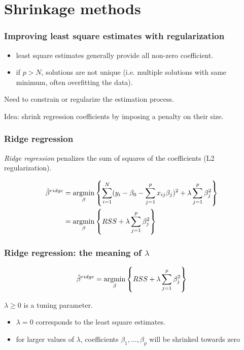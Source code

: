 \documentclass[notes]{beamer}          %
\newcommand{\argmin}{\operatornamewithlimits{argmin}}
\begin{document}
\section{Shrinkage methods}

\begin{frame}
\frametitle{Improving least square estimates with regularization}
\begin{itemize}
	\item least square estimates generally provide all non-zero coefficient.
	\item if $p>N$, solutions are not unique (i.e. multiple solutions with same minimum, often overfitting the data).
\end{itemize}


\vspace{5mm} 

Need to constrain or regularize the estimation process.

\vspace{5mm} 

Idea: shrink regression coefficients by imposing a penalty on their size.


\end{frame}

\begin{frame}
\frametitle{Ridge regression}
\textit{Ridge regression} penalizes the sum of squares of the coefficients (L2 regularization). 

\begin{align*}
\hat{\beta}^{ridge} &= \argmin_{\beta} \left\{ \sum_{i=1}^N (y_i - \beta_0 -  \sum_{j=1}^p x_{ij}\beta_j)^2 + \lambda \sum_{j=1}^p \beta_j^2 \right\} \\
& =  \argmin_{\beta} \left\{ RSS + \lambda \sum_{j=1}^p \beta_j^2 \right\}
\end{align*}

\end{frame}


\begin{frame}
\frametitle{Ridge regression: the meaning of $\lambda$}

\begin{equation*}
    \hat{\beta}^{ridge} =  \argmin_{\beta} \left\{ RSS + \lambda \sum_{j=1}^p \beta_j^2 \right\}
\end{equation*}

$\lambda \geq 0$ is a tuning parameter.

\begin{itemize}
    \item $\lambda = 0$ corresponds to the least square estimates.
    \item for larger values of $\lambda$, coefficients $\beta_1, \dots, \beta_p$ will be shrinked towards zero
\end{itemize}
\end{frame}
\end{document}
